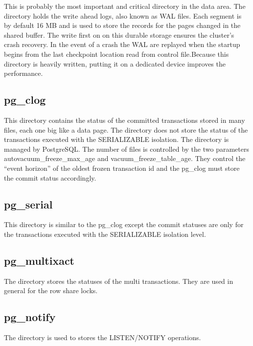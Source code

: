 This is probably the most important and critical directory in the data area.
The directory holds the write ahead logs,  also known as WAL
files. Each segment is by default 16 MB and is used to store the records for
the pages changed in the shared buffer. The write first on on this durable
storage ensures the cluster's crash recovery. In the event of a crash the WAL
are replayed when the startup begins from the last checkpoint location read
from control file.Because this directory is heavily written, putting it on a
dedicated device improves the performance.

\subsection{pg\_clog}

This directory contains the status of the committed transactions stored in many
files, each one big like a data page. The directory does not store the status
of the transactions executed with the SERIALIZABLE isolation. The directory is
managed by PostgreSQL. The number of files is controlled by the two parameters
autovacuum\_freeze\_max\_age and vacuum\_freeze\_table\_age. They control the
``event horizon'' of the oldest frozen transaction id and the pg\_clog must
store the commit status accordingly.

\subsection{pg\_serial}

This directory is similar to the pg\_clog except the commit statuses are only
for the transactions executed with the SERIALIZABLE isolation level.

\subsection{pg\_multixact}

The directory stores the statuses of the multi transactions. They are used in
general for the row share locks.

\subsection{pg\_notify}

The directory is used to stores the LISTEN/NOTIFY operations.

